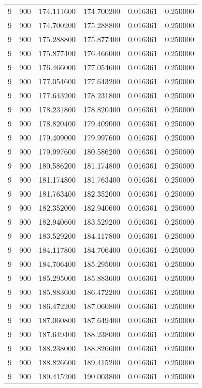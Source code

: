 \begin{longtable}{rrrrrr}
9 & 900 & 174.111600 & 174.700200 & 0.016361 & 0.250000 \\
9 & 900 & 174.700200 & 175.288800 & 0.016361 & 0.250000 \\
9 & 900 & 175.288800 & 175.877400 & 0.016361 & 0.250000 \\
9 & 900 & 175.877400 & 176.466000 & 0.016361 & 0.250000 \\
9 & 900 & 176.466000 & 177.054600 & 0.016361 & 0.250000 \\
9 & 900 & 177.054600 & 177.643200 & 0.016361 & 0.250000 \\
9 & 900 & 177.643200 & 178.231800 & 0.016361 & 0.250000 \\
9 & 900 & 178.231800 & 178.820400 & 0.016361 & 0.250000 \\
9 & 900 & 178.820400 & 179.409000 & 0.016361 & 0.250000 \\
9 & 900 & 179.409000 & 179.997600 & 0.016361 & 0.250000 \\
9 & 900 & 179.997600 & 180.586200 & 0.016361 & 0.250000 \\
9 & 900 & 180.586200 & 181.174800 & 0.016361 & 0.250000 \\
9 & 900 & 181.174800 & 181.763400 & 0.016361 & 0.250000 \\
9 & 900 & 181.763400 & 182.352000 & 0.016361 & 0.250000 \\
9 & 900 & 182.352000 & 182.940600 & 0.016361 & 0.250000 \\
9 & 900 & 182.940600 & 183.529200 & 0.016361 & 0.250000 \\
9 & 900 & 183.529200 & 184.117800 & 0.016361 & 0.250000 \\
9 & 900 & 184.117800 & 184.706400 & 0.016361 & 0.250000 \\
9 & 900 & 184.706400 & 185.295000 & 0.016361 & 0.250000 \\
9 & 900 & 185.295000 & 185.883600 & 0.016361 & 0.250000 \\
9 & 900 & 185.883600 & 186.472200 & 0.016361 & 0.250000 \\
9 & 900 & 186.472200 & 187.060800 & 0.016361 & 0.250000 \\
9 & 900 & 187.060800 & 187.649400 & 0.016361 & 0.250000 \\
9 & 900 & 187.649400 & 188.238000 & 0.016361 & 0.250000 \\
9 & 900 & 188.238000 & 188.826600 & 0.016361 & 0.250000 \\
9 & 900 & 188.826600 & 189.415200 & 0.016361 & 0.250000 \\
9 & 900 & 189.415200 & 190.003800 & 0.016361 & 0.250000 \\

\end{longtable}
